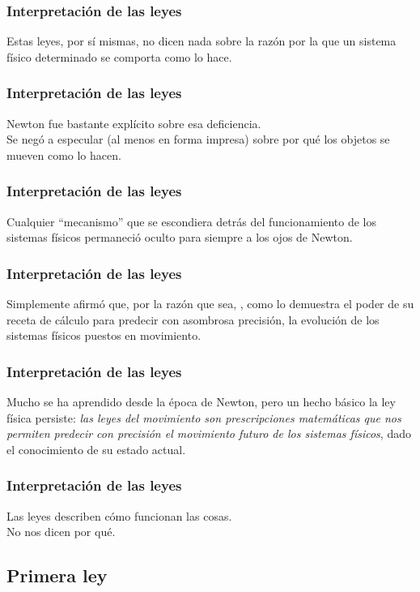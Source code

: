 \documentclass[12pt]{beamer}
\begin{document}
\begin{frame}
\frametitle{Interpretación de las leyes}
Estas leyes, por sí mismas, no dicen nada sobre la razón por la que un sistema físico determinado se comporta como lo hace.
\end{frame}
\begin{frame}
\frametitle{Interpretación de las leyes}
Newton fue bastante explícito sobre esa deficiencia.
\\
\bigskip
\pause
Se negó a especular (al menos en forma impresa) sobre por qué los objetos se mueven como lo hacen.
\end{frame}
\begin{frame}
\frametitle{Interpretación de las leyes}
Cualquier \enquote{mecanismo} que se escondiera detrás del funcionamiento de los sistemas físicos permaneció oculto para siempre a los ojos de Newton.
\end{frame}
\begin{frame}
\frametitle{Interpretación de las leyes}
Simplemente afirmó que, por la razón que sea, , \pause como lo demuestra el poder de su receta de cálculo para predecir con asombrosa precisión, la evolución de los sistemas físicos puestos en movimiento.
\end{frame}
\begin{frame}
\frametitle{Interpretación de las leyes}
Mucho se ha aprendido desde la época de Newton, pero un hecho básico la ley física persiste: \pause \emph{las leyes del movimiento son prescripciones matemáticas que nos permiten predecir con precisión el movimiento futuro de los sistemas físicos}, dado el conocimiento de su estado actual.
\end{frame}
\begin{frame}
\frametitle{Interpretación de las leyes}
Las leyes describen cómo funcionan las cosas.
\\
\bigskip
\pause
No nos dicen por qué.
\end{frame}

\subsection{Primera ley}
\end{document}
